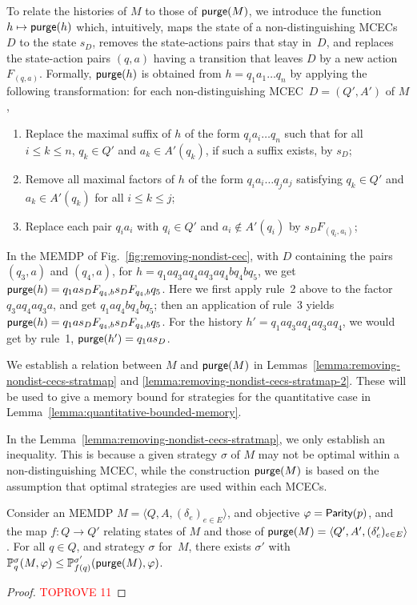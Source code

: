 \documentclass[a4paper,USenglish,cleveref, autoref, thm-restate]{lipics-v2021}
\newcommand{\tuple}[1]{\langle #1 \rangle}
\newcommand*{\pr}{\mathbb{P}}
\newcommand\Parity{\textrm{\sf Parity}}
\newcommand\freshaction[1]{F_{#1}}
\newcommand\purge[1]{\textrm{\sf purge}(#1)}
\begin{document}
To relate the histories of $M$ to those of $\purge{M}$, we introduce the function $h\mapsto \purge{h}$ which, 
intuitively, maps the state of a non-distinguishing MCECs $D$ to the state $s_D$,
removes the state-actions pairs that stay in~$D$, and replaces the state-action pairs $(q,a)$ having a transition that leaves $D$ by a new action $\freshaction{(q,a)}$.
Formally, $\purge{h}$ is obtained from $h=q_1a_1\ldots q_n$ by applying the following transformation:
for each non-distinguishing MCEC~$D=(Q',A')$ of $M$,
\begin{enumerate}
  \item Replace the maximal suffix of $h$ of the form $q_ia_i\ldots q_n$
  such that for all $i\leq k \leq n$, $q_k\in Q'$ and $a_k\in A'(q_k)$, 
  if such a suffix exists, by $s_D$;
  \item Remove all maximal factors of $h$ of the form $q_ia_i\ldots q_ja_j$
  satisfying $q_k \in Q'$ and $a_k\in A'(q_k)$ for all $i \leq k \leq j$;
  \item Replace each pair $q_ia_i$ with $q_i \in Q'$ and $a_i \not \in A'(q_i)$ by $s_D \freshaction{(q_i,a_i)}$;    
\end{enumerate} 

\begin{example}
  In the MEMDP of Fig.~\ref{fig:removing-nondist-cec},
  with $D$ containing the pairs $(q_3,a)$ and $(q_4,a)$, 
  for $h=q_1a q_3aq_4aq_3 a q_4 b q_4 b q_5$, we get 
  $\purge{h}=q_1a s_D F_{q_4,b} s_D F_{q_4,b} q_5$.
  Here we first apply rule~2 above to the factor $q_3aq_4aq_3 a$, and get
  $q_1 a q_4 b q_4 b q_5$; then an application of rule~3 yields
  $\purge{h}=q_1a s_D F_{q_4,b} s_D F_{q_4,b} q_5$.
  For the history $h'=q_1a q_3aq_4aq_3 a q_4$, we would get by rule~1,
  $\purge{h'}=q_1 a s_D$.
\end{example}

We establish a relation between $M$ and $\purge{M}$ in Lemmas~\ref{lemma:removing-nondist-cecs-stratmap} and \ref{lemma:removing-nondist-cecs-stratmap-2}.
These will be used to give a memory bound for strategies for the quantitative case in Lemma~\ref{lemma:quantitative-bounded-memory}.

In the Lemma~\ref{lemma:removing-nondist-cecs-stratmap}, we only establish an inequality. This is because a given strategy $\sigma$ of $M$
may not be optimal within a non-distinguishing MCEC, while the construction $\purge{M}$ is based on the assumption that optimal strategies are used within each MCECs.


\begin{lemma}
  \label{lemma:removing-nondist-cecs-stratmap}
  Consider an MEMDP $M=\tuple{Q,A,(\delta_e)_{e\in E}}$, and objective $\varphi=\Parity(p)$,
  and the map $f:Q\rightarrow Q'$ relating states of $M$ and those of $\purge{M} = \tuple{Q',A',(\delta_e')_{e\in E}}$.
  For all $q \in Q$, and strategy $\sigma$ for~$M$, there exists $\sigma'$ with
  $\pr_{q}^\sigma(M,\varphi) \leq \pr_{f(q)}^{\sigma'}(\purge{M},\varphi)$.
\end{lemma}
\begin{proof}\textcolor{red}{TOPROVE 11}\end{proof}
\end{document}
